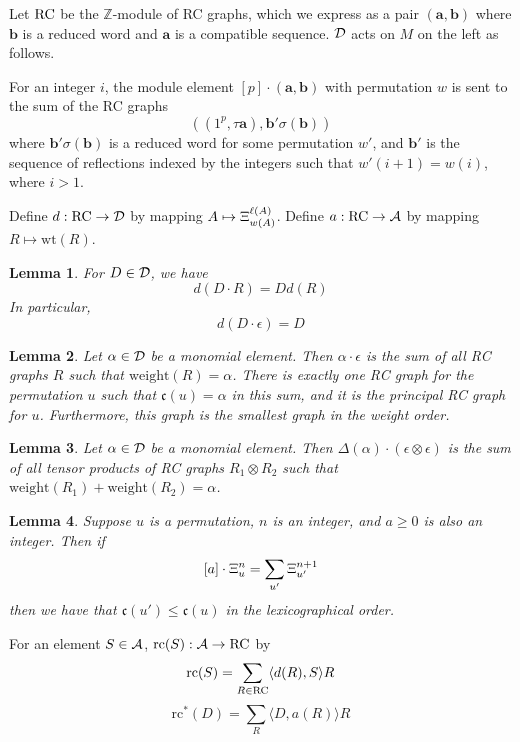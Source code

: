 \documentclass{elsarticle}
\newtheorem{lemma}{Lemma}[section]
\theoremstyle{definition}
\theoremstyle{remark}
\numberwithin{equation}{subsection}
\DeclareMathOperator{\sch}{\mathfrak{S}}
\newcommand{\code}{\mathfrak{c}}
\begin{document}
Let $\mathrm{RC}$ be the $\mathbb{Z}$-module of RC graphs, which we express as a pair $(\mathbf{a},\mathbf{b})$ where $\mathbf{b}$ is a reduced word and $\mathbf{a}$ is a compatible sequence. $\mathcal{D}$ acts on $M$ on the left as follows. 

For an integer $i$, the module element $[p]\cdot(\mathbf{a},\mathbf{b})$ with permutation $w$ is sent to the sum of the RC graphs 
$$((1^p,\tau\mathbf{a}),\mathbf{b}'\sigma(\mathbf{b}))$$
where $\mathbf{b}'\sigma(\mathbf{b})$ is a reduced word for some permutation $w'$, and $\mathbf{b}'$ is the sequence of reflections indexed by the integers such that $w'(i+1)=w(i)$, where $i>1$.

Define $d:\mathrm{RC}\to\mathcal{D}$ by mapping $A\mapsto \Xi_{w(A)}^{\ell(A)}$. Define $a:\mathrm{RC}\to\mathcal{A}$ by mapping $R\mapsto \mathrm{wt}(R)$. 

\begin{lemma}
	For $D\in \mathcal{D}$, we have 
	$$d(D\cdot R)=Dd(R)$$ 
In particular,
$$d(D\cdot\epsilon)=D$$
\end{lemma} 
\newcommand{\rc}{\mathrm{rc}}

\begin{lemma}
	Let $\alpha\in \mathcal{D}$ be a monomial element. Then $\alpha\cdot\epsilon$ is the sum of all RC graphs $R$ such that $\mathrm{weight}(R)=\alpha$. There is exactly one RC graph for the permutation $u$ such that $\code(u)=\alpha$ in this sum, and it is the principal RC graph for $u$. Furthermore, this graph is the smallest graph in the weight order.
\end{lemma}

\begin{lemma}
	Let $\alpha\in \mathcal{D}$ be a monomial element. Then $\Delta(\alpha)\cdot(\epsilon\otimes \epsilon)$ is the sum of all tensor products of RC graphs $R_1\otimes R_2$ such that $\mathrm{weight}(R_1)+\mathrm{weight}(R_2)=\alpha$.
\end{lemma}

\begin{lemma}
	Suppose $u$ is a permutation, $n$ is an integer, and $a\geq 0$ is also an integer. Then if
	$$[a]\cdot\Xi_u^n=\sum_{u'}\Xi_{u'}^{n+1}$$
	then we have that $\code(u')\leq \code(u)$ in the lexicographical order.
\end{lemma}






For an element $S\in \mathcal{A}$, $\rc(S):\coma\to\RC$ by
$$\rc(S) = \sum_{R\in\RC}\langle d(R),S\rangle R$$
$$\rc^*(D) = \sum_R \langle D, a(R)\rangle R$$
\end{document}
